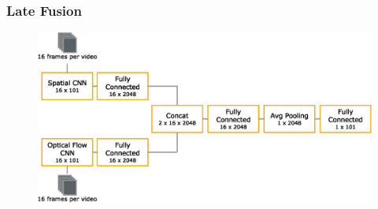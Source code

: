 \subsubsection{Late Fusion}


\begin{figure}[!htb]
	\centering
	\includegraphics[scale=.7]{images/late_fusion.eps}
	\caption{}
	\label{fig:late_fusion}
\end{figure}



